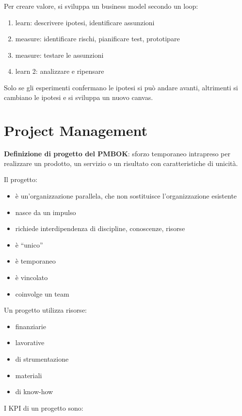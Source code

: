 \documentclass[answers, a4paper, 11pt]{exam}
\begin{document}
Per creare valore, si sviluppa un business model secondo un loop:

\begin{enumerate}
    \item learn: descrivere ipotesi, identificare assunzioni
    \item measure: identificare rischi, pianificare test, prototipare
    \item measure: testare le assunzioni
    \item learn 2: analizzare e ripensare
\end{enumerate}

Solo se gli esperimenti confermano le ipotesi si può andare avanti, altrimenti si cambiano le ipotesi e si sviluppa un nuovo canvas.

\section{Project Management}

\textbf{Definizione di progetto del PMBOK}: sforzo temporaneo intrapreso per realizzare un prodotto, un servizio o un risultato con caratteristiche di unicità.

Il progetto:

\begin{itemize}
    \item è un'organizzazione parallela, che non sostituisce l'organizzazione esistente
    \item nasce da un impulso
    \item richiede interdipendenza di discipline, conoscenze, risorse
    \item è ``unico''
    \item è temporaneo
    \item è vincolato
    \item coinvolge un team
\end{itemize} 

Un progetto utilizza risorse:

\begin{itemize}
    \item finanziarie
    \item lavorative
    \item di strumentazione
    \item materiali
    \item di know-how
\end{itemize}

I KPI di un progetto sono:
\end{document}
